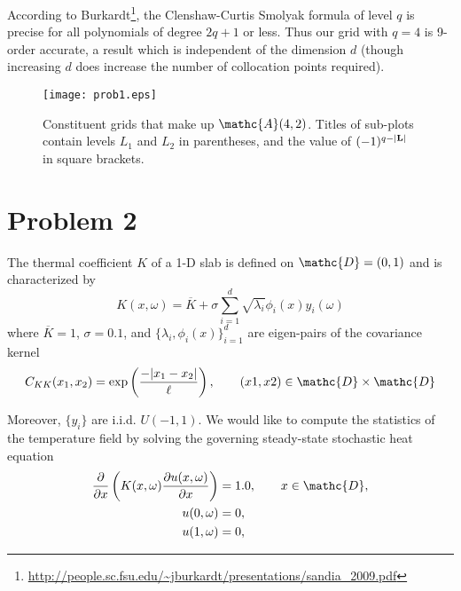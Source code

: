 \documentclass[11pt]{article}
\begin{document}
According to Burkardt\footnote{\url{http://people.sc.fsu.edu/~jburkardt/presentations/sandia_2009.pdf}}, the Clenshaw-Curtis Smolyak formula of level $q$ is precise for all polynomials of degree $2q+1$ or less. Thus our grid with $q=4$ is 9\th-order accurate, a result which is independent of the dimension $d$ (though increasing $d$ does increase the number of collocation points required).

\begin{figure}[h]
\centering
\texttt{[image: prob1.eps]}
\caption{Constituent grids that make up $\mathc{A}(4,2)$. Titles of sub-plots contain levels $L_1$ and $L_2$ in parentheses, and the value of $(-1)^{q-|\mb{L}|}$ in square brackets.}
\label{fig:prob1}
\end{figure}

\section*{Problem 2} %

The thermal coefficient $K$ of a 1-D slab is defined on $\mathc{D} = (0,1)$ and is characterized by
\begin{equation}
K(x,\omega) = \overline{K} + \sigma \sum_{i=1}^d \sqrt{\lambda_i} \phi_i(x) y_i(\omega)
\end{equation}
where $\overline{K}=1$, $\sigma=0.1$, and $\{ \lambda_i, \phi_i(x) \}_{i=1}^d$ are eigen-pairs of the covariance kernel
\begin{equation}
C_{KK}(x_1,x_2) = \exp \left( \frac{- | x_1-x_2 | }{\ell} \right), \qquad (x1,x2) \in \mathc{D} \times \mathc{D}
\end{equation}

Moreover, $\{y_i\}$ are i.i.d. $U(-1,1)$. We would like to compute the statistics of the temperature field by solving the governing steady-state stochastic heat equation
\begin{equation}
\begin{aligned}
\pp{}{x} \left( K(x,\omega) \pp{u(x,\omega)}{x} \right) &= 1.0, \qquad x \in \mathc{D}, \\
u(0,\omega) &= 0, \\
u(1,\omega) &= 0,
\end{aligned}
\label{eq:pde}
\end{equation}
\end{document}
